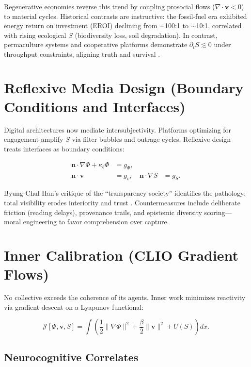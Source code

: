 \documentclass[12pt,a4paper]{article}
\begin{document}
Regenerative economies reverse this trend by coupling prosocial flows ($\nabla\!\cdot\!\bm{v} < 0$) to material cycles. Historical contrasts are instructive: the fossil-fuel era exhibited energy return on investment (EROI) declining from $\sim$100:1 to $\sim$10:1, correlated with rising ecological $S$ (biodiversity loss, soil degradation). In contrast, permaculture systems and cooperative platforms demonstrate $\partial_t S \lesssim 0$ under throughput constraints, aligning truth and survival \cite{schmachtenberger2020metacrisis}.

\section{Reflexive Media Design \quad (Boundary Conditions and Interfaces)}

Digital architectures now mediate intersubjectivity. Platforms optimizing for engagement amplify $S$ via filter bubbles and outrage cycles. Reflexive design treats interfaces as boundary conditions:

\begin{align}
\bm{n}\!\cdot\!\nabla \Phi + \kappa_b \Phi &= g_\Phi, \\
\bm{n}\!\cdot\!\bm{v} &= g_v, \quad
\bm{n}\!\cdot\!\nabla S &= g_S.
\end{align}

Byung-Chul Han’s critique of the “transparency society” identifies the pathology: total visibility erodes interiority and trust \cite{han2015transparency,han2015burnout}. Countermeasures include deliberate friction (reading delays), provenance trails, and epistemic diversity scoring—moral engineering to favor comprehension over capture.

\section{Inner Calibration \quad (CLIO Gradient Flows)}

No collective exceeds the coherence of its agents. Inner work minimizes reactivity via gradient descent on a Lyapunov functional:

\begin{equation}
\mathcal{J}[\Phi,\bm{v},S] = \int \left( \frac{1}{2}\|\nabla \Phi\|^2 + \frac{\beta}{2}\|\bm{v}\|^2 + U(S) \right) dx.
\end{equation}

\subsection{Neurocognitive Correlates}
\end{document}
